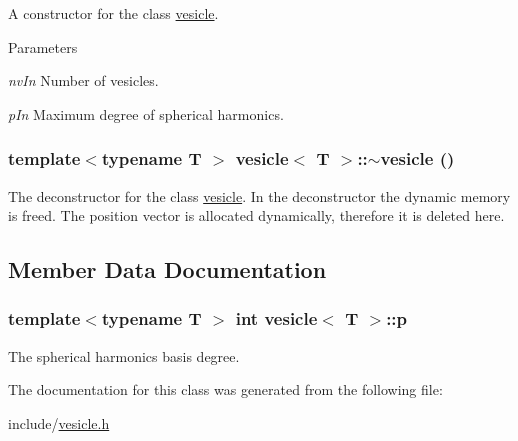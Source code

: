 A constructor for the class \hyperlink{classvesicle}{vesicle}. 
\begin{DoxyParams}{Parameters}
\item[{\em nvIn}]Number of vesicles. \item[{\em pIn}]Maximum degree of spherical harmonics. \end{DoxyParams}
\hypertarget{classvesicle_a2ee2cc68356721b787bf7fe60b9ce08e}{
\subsubsection[{$\sim$vesicle}]{\setlength{\rightskip}{0pt plus 5cm}template$<$typename T $>$ {\bf vesicle}$<$ T $>$::$\sim${\bf vesicle} ()}}
\label{classvesicle_a2ee2cc68356721b787bf7fe60b9ce08e}


The deconstructor for the class \hyperlink{classvesicle}{vesicle}. In the deconstructor the dynamic memory is freed. The position vector is allocated dynamically, therefore it is deleted here. 

\subsection{Member Data Documentation}
\hypertarget{classvesicle_a34acbe9c962bc2be315cfa096989241e}{
\subsubsection[{p}]{\setlength{\rightskip}{0pt plus 5cm}template$<$typename T $>$ int {\bf vesicle}$<$ T $>$::{\bf p}}}
\label{classvesicle_a34acbe9c962bc2be315cfa096989241e}


The spherical harmonics basis degree. 

The documentation for this class was generated from the following file:\begin{DoxyCompactItemize}
\item 
include/\hyperlink{vesicle_8h}{vesicle.h}\end{DoxyCompactItemize}
